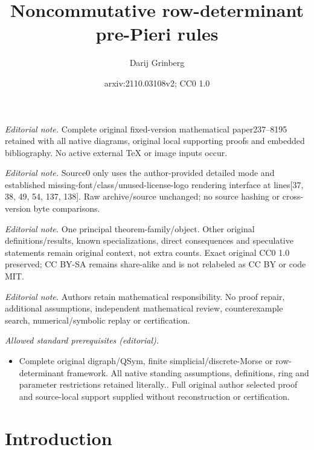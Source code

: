 \documentclass[numbers=enddot,12pt,final,onecolumn,notitlepage,english]{scrartcl}%
\title{Noncommutative row-determinant pre-Pieri rules}
\author{Darij Grinberg}
\date{arxiv:2110.03108v2; CC0 1.0}
\theoremstyle{definition}
\begin{document}
\maketitle
\noindent\textit{Editorial note.} Complete original fixed-version mathematical paper237--8195 retained with all native diagrams, original local supporting proofs and embedded bibliography. No active external TeX or image inputs occur.\par\medskip
\noindent\textit{Editorial note.} Source0 only uses the author-provided detailed mode and established missing-font/class/unused-license-logo rendering interface at lines[37, 38, 49, 54, 137, 138]. Raw archive/source unchanged; no source hashing or cross-version byte comparisons.\par\medskip
\noindent\textit{Editorial note.} One principal theorem-family/object. Other original definitions/results, known specializations, direct consequences and speculative statements remain original context, not extra counts. Exact original CC0 1.0 preserved; CC BY-SA remains share-alike and is not relabeled as CC BY or code MIT.\par\medskip
\noindent\textit{Editorial note.} Authors retain mathematical responsibility. No proof repair, additional assumptions, independent mathematical review, counterexample search, numerical/symbolic replay or certification.\par\medskip
\noindent\textit{Allowed standard prerequisites (editorial).}\begin{itemize}
\item Complete original digraph/QSym, finite simplicial/discrete-Morse or row-determinant framework. All native standing assumptions, definitions, ring and parameter restrictions retained literally.. Full original author selected proof and source-local support supplied without reconstruction or certification.
\end{itemize}\medskip
\section*{Introduction}
\end{document}
